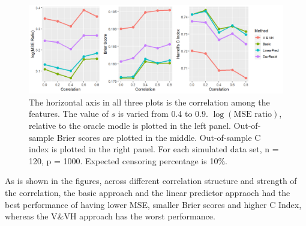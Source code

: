 \documentclass{article}
\begin{document}
\begin{figure}[ht]
  \centering
  \includegraphics[width=\textwidth]{manuscript_figure/figure_2_auto.png}
  \caption{\label{Fig:auto} The horizontal axis in all three plots is the correlation among the features. The value of $s$ is varied from 0.4 to 0.9.  $\log(\text{MSE ratio})$, relative to the oracle modle is plotted in the left panel. Out-of-sample Brier scores are plotted in the middle. Out-of-sample C index is plotted in the right panel. For each simulated data set, n = 120, p = 1000. Expected censoring percentage is 10$\%$.}
\end{figure}	

As is shown in the figures, across different correlation structure and strength of the correlation, the basic approach and the linear predictor appraoch had the best performance of having lower MSE, smaller Brier scores and higher C Index, whereas the V$\&$VH approach has the worst performance.



\end{document}
